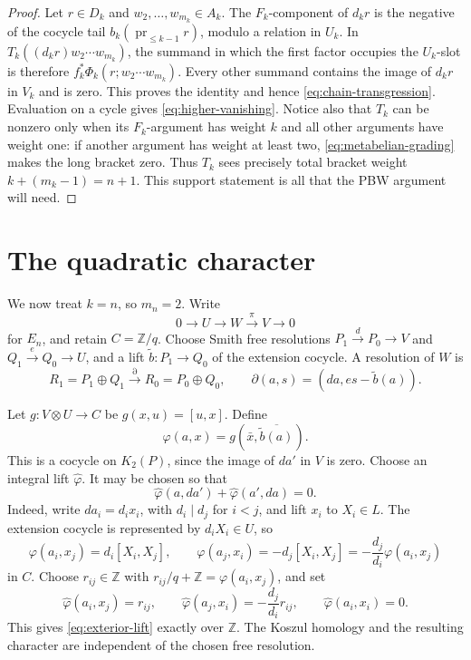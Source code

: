 \documentclass[11pt]{amsart}
\theoremstyle{remark}
\newcommand{\Z}{\mathbb Z}
\newcommand{\pr}{\operatorname{pr}}
\begin{document}
\begin{proof}
Let $r\in D_k$ and $w_2,\ldots,w_{m_k}\in A_k$.  The
$F_k$-component of $d_kr$ is the negative of the cocycle tail
$b_k(\pr_{\leq k-1}r)$, modulo a relation in $U_k$.  In
$T_k((d_kr)w_2\cdots w_{m_k})$, the summand in which the first factor
occupies the $U_k$-slot is therefore
$f_k^*\Phi_k(r;w_2\cdots w_{m_k})$.  Every other summand
contains the image of $d_kr$ in $V_k$ and is zero.  This proves the
identity and hence \eqref{eq:chain-transgression}.  Evaluation on a
cycle gives \eqref{eq:higher-vanishing}.  Notice also that $T_k$ can
be nonzero only when its $F_k$-argument has weight $k$ and all other
arguments have weight one: if another argument has weight at least
two, \eqref{eq:metabelian-grading} makes the long bracket zero.  Thus
$T_k$ sees precisely total bracket weight
$k+(m_k-1)=n+1$.  This support statement is all that the PBW argument
will need.
\end{proof}

\section{The quadratic character}

We now treat $k=n$, so $m_n=2$.  Write
\[
 0\longrightarrow U\longrightarrow W\xrightarrow\pi V
 \longrightarrow0
\]
for $E_n$, and retain $C=\Z/q$.  Choose Smith free resolutions
$P_1\xrightarrow dP_0\to V$ and $Q_1\xrightarrow eQ_0\to U$, and a
lift $\widetilde b:P_1\to Q_0$ of the extension cocycle.  A resolution
of $W$ is
\begin{equation}\label{eq:quadratic-resolution}
 R_1=P_1\oplus Q_1\xrightarrow\partial R_0=P_0\oplus Q_0,
 \qquad
 \partial(a,s)=(da,es-\widetilde b(a)).
\end{equation}

Let $g:V\otimes U\to C$ be $g(x,u)=[u,x]$.  Define
\begin{equation}\label{eq:quadratic-phi}
 \varphi(a,x)=g(\bar x,\overline{\widetilde b(a)}).
\end{equation}
This is a cocycle on $K_2(P)$, since the image of $da'$ in $V$ is zero.
Choose an integral lift $\widehat\varphi$.  It may be chosen so that
\begin{equation}\label{eq:exterior-lift}
 \widehat\varphi(a,da')+\widehat\varphi(a',da)=0.
\end{equation}
Indeed, write $da_i=d_ix_i$, with $d_i\mid d_j$ for $i<j$, and lift
$x_i$ to $X_i\in L$.  The extension cocycle is represented by
$d_iX_i\in U$, so
\[
 \varphi(a_i,x_j)=d_i[X_i,X_j],
 \qquad
 \varphi(a_j,x_i)=-d_j[X_i,X_j]
 =-\frac{d_j}{d_i}\varphi(a_i,x_j)
\]
in $C$.  Choose $r_{ij}\in\Z$ with
$r_{ij}/q+\Z=\varphi(a_i,x_j)$, and set
\[
 \widehat\varphi(a_i,x_j)=r_{ij},
 \qquad
 \widehat\varphi(a_j,x_i)=-\frac{d_j}{d_i}r_{ij},
 \qquad
 \widehat\varphi(a_i,x_i)=0.
\]
This gives
\eqref{eq:exterior-lift} exactly over $\Z$.  The Koszul homology and the
resulting character are independent of the chosen free resolution.
\end{document}
